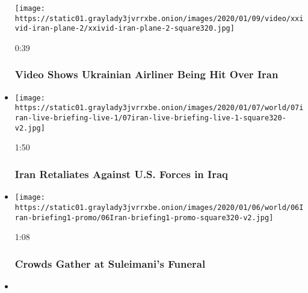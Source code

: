 \begin{itemize}
  \texttt{[image: https://static01.graylady3jvrrxbe.onion/images/2020/01/09/video/xxivid-iran-plane-2/xxivid-iran-plane-2-square320.jpg]}

  0:39

  \hypertarget{video-shows-ukrainian-airliner-being-hit-over-iran}{%
  \subsubsection{Video Shows Ukrainian Airliner Being Hit Over
  Iran}\label{video-shows-ukrainian-airliner-being-hit-over-iran}}
\item
  \href{https://www.nytimes3xbfgragh.onion/video/world/middleeast/100000006908788/iran-us-missile-attack.html?action=click\&module=video-series-bar\&region=header\&pgtype=Article\&playlistId=video/us-iran-relations}{}

  \texttt{[image: https://static01.graylady3jvrrxbe.onion/images/2020/01/07/world/07iran-live-briefing-live-1/07iran-live-briefing-live-1-square320-v2.jpg]}

  1:50

  \hypertarget{iran-retaliates-against-us-forces-in-iraq}{%
  \subsubsection{Iran Retaliates Against U.S. Forces in
  Iraq}\label{iran-retaliates-against-us-forces-in-iraq}}
\item
  \href{https://www.nytimes3xbfgragh.onion/video/world/100000006905752/suleimani-funeral.html?action=click\&module=video-series-bar\&region=header\&pgtype=Article\&playlistId=video/us-iran-relations}{}

  \texttt{[image: https://static01.graylady3jvrrxbe.onion/images/2020/01/06/world/06Iran-briefing1-promo/06Iran-briefing1-promo-square320-v2.jpg]}

  1:08

  \hypertarget{crowds-gather-at-suleimanis-funeral}{%
  \subsubsection{Crowds Gather at Suleimani's
  Funeral}\label{crowds-gather-at-suleimanis-funeral}}
\item
  \href{https://www.nytimes3xbfgragh.onion/video/world/middleeast/100000006904547/iran-funeral-soleimani.html?action=click\&module=video-series-bar\&region=header\&pgtype=Article\&playlistId=video/us-iran-relations}{}


\end{itemize}
